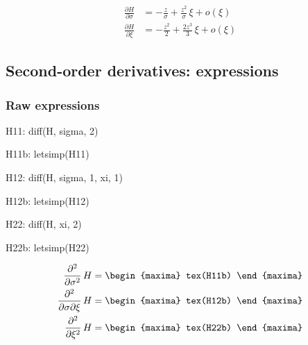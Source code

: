 {\color{red}
  \begin{align*}
    \frac{\partial H}{\partial \sigma}
    &=  - \frac{z}{\sigma} + \frac{z^2}{\sigma}\, \xi+ o(\xi) \\
    \frac{\partial H}{\partial \xi}
    &=  - \frac{z^2}{2} + \frac{2 z^3}{3} \, \xi  + o(\xi)
  \end{align*}
}
  
\subsection{Second-order derivatives: expressions}
 \subsubsection*{Raw expressions}
 
 
 \begin{maxima}
   H11: diff(H, sigma, 2)
 \end{maxima}%
 \begin{maxima}
   H11b: letsimp(H11)
 \end{maxima}%
 
 \begin{maxima}
   H12: diff(H, sigma, 1, xi, 1)
 \end{maxima}%
 
 \begin{maxima}
   H12b: letsimp(H12)
 \end{maxima}%
 
 \begin{maxima}
   H22: diff(H, xi, 2)
 \end{maxima}%
 
 \begin{maxima}
   H22b: letsimp(H22)
 \end{maxima}%
 
{\color{MonVertF}  
\begin{align*}
\frac{\partial^2}{\partial \sigma^2} \, H &= 
\begin{maxima}
  tex(H11b)
\end{maxima}\\
\frac{\partial^2}{\partial \sigma \partial \xi} \, H &=
\begin{maxima}
  tex(H12b)
\end{maxima}\\
 \frac{\partial^2}{\partial \xi^2}\, H &=
\begin{maxima}
 tex(H22b)
\end{maxima}
\end{align*}                                         
}

